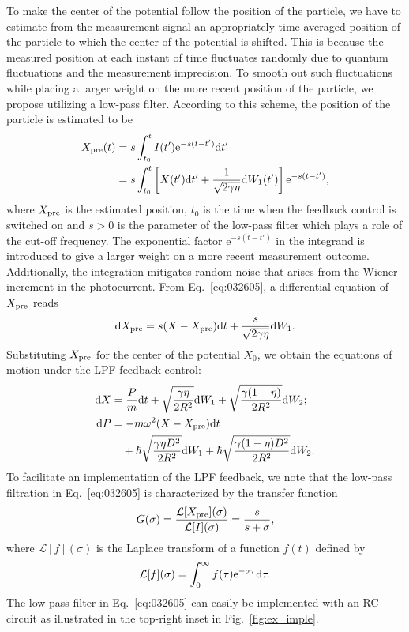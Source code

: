 \documentclass[aps,pra,superscriptaddress,twocolumn
]{revtex4-2}
\newcommand{\e}{\mathrm{e}}
\renewcommand{\d}{{\rm d}}
\begin{document}
 To make the center of the potential follow the position of the particle, 
 we have to estimate from the measurement signal 
 an appropriately time-averaged position of the particle 
 to which the center of the potential is shifted.
 This is because the measured position at each instant of time fluctuates randomly 
 due to quantum fluctuations and the measurement imprecision. 
 To smooth out such fluctuations while placing a larger weight on the more recent position of the particle, 
 we propose utilizing a low-pass filter.
 According to this scheme, the position of the particle is estimated to be 
 \begin{alignat}{1}
  X_{\rm pre}(t) &= s \int_{t_0}^t I(t') \e^{-s(t-t')} \d t' \notag \\
   &= s \int_{t_0}^t \left[
  X(t') \d t' +\frac{1}{\sqrt{2\gamma\eta}}\d W_1(t')
  \right] \e^{-s(t-t')}, \label{eq:032605}
 \end{alignat}
 where $X_{\rm pre}$ is the estimated position, 
 $t_0$ is the time when the feedback control is switched on 
 and $s > 0$ is the parameter of the low-pass filter which plays a role of the cut-off frequency.
 The exponential factor $\e^{-s(t-t')}$ in the integrand is introduced 
 to give a larger weight on a more recent measurement outcome.
 Additionally, the integration mitigates random noise  
 that arises from the Wiener increment in the photocurrent.
 From Eq.~\eqref{eq:032605}, a differential equation of $X_{\rm pre}$ reads
 \begin{equation}
  \d X_{\rm pre} = s(X-X_{\rm pre})\d t + \frac{s}{\sqrt{2\gamma\eta}}\d W_1. \label{eq042102}
 \end{equation}
 Substituting $X_{\rm pre}$ for the center of the potential $X_0$,
 we obtain the equations of motion under the LPF feedback control:
 \begin{alignat}{1}
  \d X &= \frac{P}{m}\d t + \sqrt{\frac{\gamma\eta}{2R^2}}\d W_1 + \sqrt{\frac{\gamma(1-\eta)}{2R^2}} \d W_2; 
  \label{eq:EoM-X} \\
  \d P &= - m\omega^2 (X-X_{\rm pre})\d t \notag \\
  &\quad + \hbar \sqrt{\frac{\gamma\eta D^2}{2R^2}}\d W_1 + \hbar \sqrt{\frac{\gamma(1-\eta)D^2}{2R^2}}\d W_2.
  \label{eq042103}
 \end{alignat} 
 {
 To facilitate an implementation of the LPF feedback,
 we note that}
 the low-pass filtration in Eq.~\eqref{eq:032605} 
 is characterized by the transfer function
 \begin{equation}
  G(\sigma) = \frac{\mathcal{L}[X_{\rm pre}](\sigma)}{\mathcal{L}[I](\sigma)} = \frac{s}{s+\sigma},
 \end{equation}
 where $\mathcal{L}[f](\sigma)$ is the Laplace transform of a function $f(t)$ defined by 
 \begin{equation}
  \mathcal{L}[f](\sigma) = \int_0^\infty f(\tau) \e^{-\sigma \tau} \d \tau.
 \end{equation}
 The low-pass filter in Eq.~\eqref{eq:032605} can easily be implemented 
 with an RC circuit as illustrated in the top-right inset in Fig.~\ref{fig:ex_imple}.
 
\end{document}
